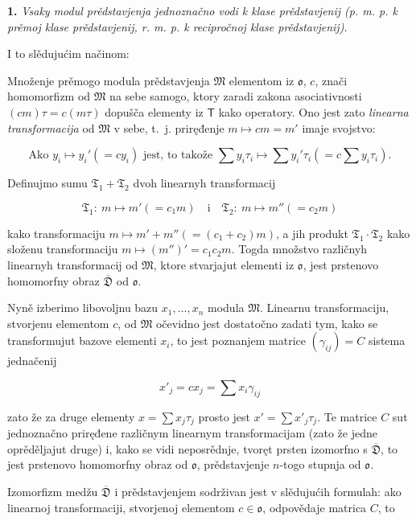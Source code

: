 \documentclass[11pt]{article}
\begin{document}
\textbf{1.} \emph{Vsaky modul prědstavjenja jednoznačno vodi k klase prědstavjenij (p. m. p. k prěmoj klase prědstavjenij, r. m. p. k recipročnoj klase prědstavjenij).}

I to slědujućim načinom:

Množenje prěmogo modula prědstavjenja \(\mathfrak M\) elementom iz \(\mathfrak{o}\), \(c\), znači homomorfizm od \(\mathfrak M\) na sebe samogo, ktory zaradi zakona asociativnosti \((cm)\tau=c(m\tau)\) dopušča elementy iz \(\mathsf T\) kako operatory. Ono jest zato \emph{linearna transformacija} od \(\mathfrak M\) v sebe, t.~j. priręđenje \(m\mapsto cm=m'\) imaje svojstvo:

\[
\text{Ako } y_i\mapsto y_i'(=cy_i) \text{ jest, to takože }
\sum y_i\tau_i\mapsto \sum y_i'\tau_i\left(=c\sum y_i\tau_i\right).
\]

Definujmo sumu \(\mathfrak T_1+\mathfrak T_2\) dvoh linearnyh transformacij

\[
\mathfrak T_1:\ m\mapsto m'(=c_1m)
\quad\text{i}\quad
\mathfrak T_2:\ m\mapsto m''(=c_2m)
\]

kako transformaciju \(m\mapsto m'+m''(=(c_1+c_2)m)\), a jih produkt \(\mathfrak T_1\cdot\mathfrak T_2\) kako složenu transformaciju \(m\mapsto (m'')'=c_1c_2m\). Togda množstvo različnyh linearnyh transformacij od \(\mathfrak M\), ktore stvarjajut elementi iz \(\mathfrak{o}\), jest prstenovo homomorfny obraz \(\overline{\mathfrak D}\) od \(\mathfrak{o}\).

Nyně izberimo libovoljnu bazu \(x_1,\ldots,x_n\) modula \(\mathfrak M\). Linearnu transformaciju, stvorjenu elementom \(c\), od \(\mathfrak M\) očevidno jest dostatočno zadati tym, kako se transformujut bazove elementi \(x_i\), to jest poznanjem matrice \((\gamma_{ij})=C\) sistema jednačenij

\[
x'_j=cx_j=\sum x_i\gamma_{ij}
\]

zato že za druge elementy \(x=\sum x_j\tau_j\) prosto jest \(x'=\sum x'_j\tau_j\). Te matrice \(C\) sut jednoznačno priręđene različnym linearnym transformacijam (zato že jedne oprěděljajut druge) i, kako se vidi neposrědnje, tvoręt prsten izomorfno s \(\overline{\mathfrak D}\), to jest prstenovo homomorfny obraz od \(\mathfrak{o}\), prědstavjenje \(n\)-togo stupnja od \(\mathfrak{o}\).

Izomorfizm medžu \(\overline{\mathfrak D}\) i prědstavjenjem sodrživan jest v slědujućih formulah: ako linearnoj transformaciji, stvorjenoj elementom \(c\in\mathfrak{o}\), odpovědaje matrica \(C\), to
\end{document}

